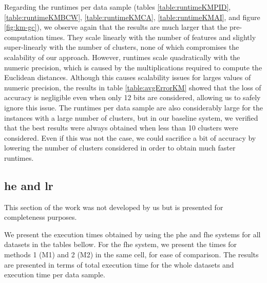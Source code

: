 Regarding the runtimes per data sample (tables \ref{table:runtimeKMPID}, \ref{table:runtimeKMBCW}, \ref{table:runtimeKMCA}, \ref{table:runtimeKMAI}, and figure \ref{fig:km-gc}), we observe again that the results are much larger that the pre-computation times. They scale linearly with the number of features and slightly super-linearly with the number of clusters, none of which compromises the scalability of our approach. However, runtimes scale quadratically with the numeric precision, which is caused by the multiplications required to compute the Euclidean distances. Although this causes scalability issues for larges values of numeric precision, the results in table \ref{table:avgErrorKM} showed that the loss of accuracy is negligible even when only 12 bits are considered, allowing us to safely ignore this issue. The runtimes per data sample are also considerably large for the instances with a large number of clusters, but in our baseline system, we verified that the best results were always obtained when less than 10 clusters were considered. Even if this was not the case, we could sacrifice a bit of accuracy by lowering the number of clusters considered in order to obtain much faster runtimes.



\subsection{\acl{he} and \acl{lr}}

This section of the work was not developed by us but is presented for completeness purposes.


We present the execution times obtained by using the \ac{phe} and \ac{fhe} systems for all datasets in the tables bellow. For the \ac{fhe} system, we present the times for methods 1 (M1) and 2 (M2) in the same cell, for ease of comparison. The results are presented in terms of total execution time for the whole datasets and execution time per data sample. 


